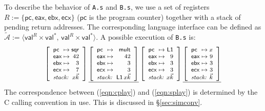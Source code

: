 \documentclass[sigplan,10pt,review]{acmart}
\newcommand{\kw}[1]{\ensuremath{ \mathsf{#1} }}
\begin{document}
\begin{example}
To describe the behavior of \texttt{A.s} and \texttt{B.s},
we use a set of registers
$R := \{ \kw{pc}, \kw{eax}, \kw{ebx}, \kw{ecx} \}$
($\kw{pc}$ is the program counter)
together with a stack of pending return addresses.
The corresponding language interface can be defined as
$\tilde{\mathcal{A}} :=
 \langle \kw{val}^R \times \kw{val}^*, \,
         \kw{val}^R \times \kw{val}^* \rangle$.
A possible execution of \texttt{B.s}
is: %
\begin{equation} \label{eqn:splay}
{
  \footnotesize
  \left[
    \begin{array}{l@{{} \mapsto {}}r}
      \kw{pc}  & \kw{sqr} \\
      \kw{eax} & 42 \\
      \kw{ebx} & 3 \\
      \kw{ecx} & 7 \\
      \multicolumn{2}{c}{\textit{stack: } \hfill x \vec{k}}
    \end{array}
  \right] %
  \underline{
    \left[
      \begin{array}{l@{{} \mapsto {}}r}
        \kw{pc}  & \kw{mult} \\
        \kw{eax} & 42 \\
        \kw{ebx} & 3 \\
        \kw{ecx} & 3 \\
        \multicolumn{2}{c}{\textit{stack: } \: \kw{L1} \, x \vec{k}}
      \end{array}
    \right]} %
  \left[
    \begin{array}{l@{{} \mapsto {}}r}
      \kw{pc}  & \kw{L1} \\
      \kw{eax} & 9 \\
      \kw{ebx} & 3 \\
      \kw{ecx} & 3 \\
      \multicolumn{2}{c}{\textit{stack: } \hfill x \vec{k}}
    \end{array}
  \right] %
  \underline{
    \left[
      \begin{array}{l@{{} \mapsto {}}r}
        \kw{pc}  & x \\
        \kw{eax} & 9 \\
        \kw{ebx} & 3 \\
        \kw{ecx} & 3 \\
        \multicolumn{2}{c}{\textit{stack: } \hfill \vec{k}}
      \end{array}
    \right]}
}
\end{equation}
The correspondence between (\ref{eqn:cplay}) and (\ref{eqn:splay})
is determined by the C calling convention in use.
This is discussed in \S\ref{sec:simconv}.
\end{example}
\end{document}
